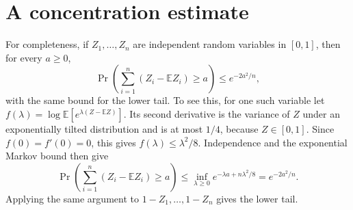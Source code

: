\documentclass[11pt]{article}
\newcommand{\E}{\mathbb{E}}
\theoremstyle{remark}
\begin{document}
\clearpage
\section{A concentration estimate}
For completeness, if $Z_1,\ldots,Z_n$ are independent random variables in
$[0,1]$, then for every $a\ge0$,
\[
 \Pr\!\left(\sum_{i=1}^n(Z_i-\E Z_i)\ge a\right)
       \le e^{-2a^2/n},
\]
with the same bound for the lower tail. To see this, for one such variable
let $f(\lambda)=\log\E[e^{\lambda(Z-\E Z)}]$. Its second derivative is the
variance of $Z$ under an exponentially tilted distribution and is at most
$1/4$, because $Z\in[0,1]$. Since $f(0)=f'(0)=0$, this gives
$f(\lambda)\le\lambda^2/8$. Independence and the exponential Markov bound
then give
\[
 \Pr\!\left(\sum_{i=1}^n(Z_i-\E Z_i)\ge a\right)
 \le\inf_{\lambda\ge0}e^{-\lambda a+n\lambda^2/8}
 =e^{-2a^2/n}.
\]
Applying the same argument to $1-Z_1,\ldots,1-Z_n$ gives the lower tail.
\end{document}
